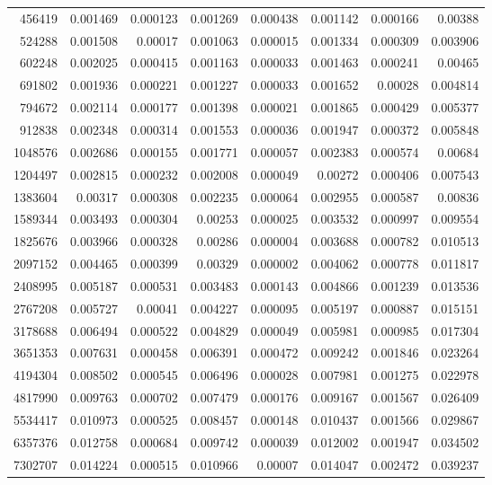 \begin{tabular}{r r r r r r r r}
456419 & 0.001469 & 0.000123 & 0.001269 & 0.000438 & 0.001142 & 0.000166 & 0.00388 \\
524288 & 0.001508 & 0.00017 & 0.001063 & 0.000015 & 0.001334 & 0.000309 & 0.003906 \\
602248 & 0.002025 & 0.000415 & 0.001163 & 0.000033 & 0.001463 & 0.000241 & 0.00465 \\
691802 & 0.001936 & 0.000221 & 0.001227 & 0.000033 & 0.001652 & 0.00028 & 0.004814 \\
794672 & 0.002114 & 0.000177 & 0.001398 & 0.000021 & 0.001865 & 0.000429 & 0.005377 \\
912838 & 0.002348 & 0.000314 & 0.001553 & 0.000036 & 0.001947 & 0.000372 & 0.005848 \\
1048576 & 0.002686 & 0.000155 & 0.001771 & 0.000057 & 0.002383 & 0.000574 & 0.00684 \\
1204497 & 0.002815 & 0.000232 & 0.002008 & 0.000049 & 0.00272 & 0.000406 & 0.007543 \\
1383604 & 0.00317 & 0.000308 & 0.002235 & 0.000064 & 0.002955 & 0.000587 & 0.00836 \\
1589344 & 0.003493 & 0.000304 & 0.00253 & 0.000025 & 0.003532 & 0.000997 & 0.009554 \\
1825676 & 0.003966 & 0.000328 & 0.00286 & 0.000004 & 0.003688 & 0.000782 & 0.010513 \\
2097152 & 0.004465 & 0.000399 & 0.00329 & 0.000002 & 0.004062 & 0.000778 & 0.011817 \\
2408995 & 0.005187 & 0.000531 & 0.003483 & 0.000143 & 0.004866 & 0.001239 & 0.013536 \\
2767208 & 0.005727 & 0.00041 & 0.004227 & 0.000095 & 0.005197 & 0.000887 & 0.015151 \\
3178688 & 0.006494 & 0.000522 & 0.004829 & 0.000049 & 0.005981 & 0.000985 & 0.017304 \\
3651353 & 0.007631 & 0.000458 & 0.006391 & 0.000472 & 0.009242 & 0.001846 & 0.023264 \\
4194304 & 0.008502 & 0.000545 & 0.006496 & 0.000028 & 0.007981 & 0.001275 & 0.022978 \\
4817990 & 0.009763 & 0.000702 & 0.007479 & 0.000176 & 0.009167 & 0.001567 & 0.026409 \\
5534417 & 0.010973 & 0.000525 & 0.008457 & 0.000148 & 0.010437 & 0.001566 & 0.029867 \\
6357376 & 0.012758 & 0.000684 & 0.009742 & 0.000039 & 0.012002 & 0.001947 & 0.034502 \\
7302707 & 0.014224 & 0.000515 & 0.010966 & 0.00007 & 0.014047 & 0.002472 & 0.039237 \\

\end{tabular}
